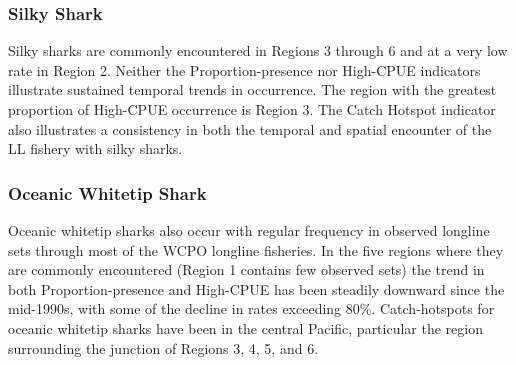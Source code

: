 \documentclass[12pt]{SCreport}
\begin{document}
          
 \subsubsection{Silky Shark}
 Silky sharks are commonly encountered in Regions 3 through 6 and at a very low rate in Region 2.  Neither the Proportion-presence nor High-CPUE indicators illustrate sustained temporal trends in occurrence.  The region with the greatest proportion of High-CPUE occurrence is Region 3.  The Catch Hotspot indicator also illustrates a consistency in both the temporal and spatial encounter of the LL fishery with silky sharks.
 \subsubsection{Oceanic Whitetip Shark}
 Oceanic whitetip sharks also occur with regular frequency in observed longline sets through most of the WCPO longline fisheries.  In the five regions where they are commonly encountered (Region 1 contains few observed sets) the trend in both Proportion-presence and High-CPUE has been steadily downward since the mid-1990s, with some of the decline in rates exceeding 80\%.  Catch-hotspots for oceanic whitetip sharks have been in the central Pacific, particular the region surrounding the junction of Regions 3, 4, 5, and 6.
\end{document}

